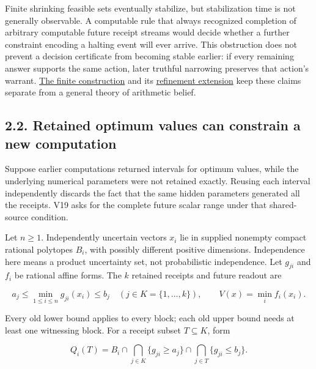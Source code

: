 \documentclass{article}
\theoremstyle{definition}
\begin{document}
Finite shrinking feasible sets eventually stabilize, but stabilization
time is not generally observable. A computable rule that always
recognized completion of arbitrary computable future receipt streams
would decide whether a further constraint encoding a halting event will
ever arrive. This obstruction does not prevent a decision certificate
from becoming stable earlier: if every remaining answer supports the
same action, later truthful narrowing preserves that action's warrant.
\href{https://github.com/TristanMiano/value_logic/blob/main/v3/derivations/03_logical_uncertainty.md}{The
finite construction} and its
\href{https://github.com/TristanMiano/value_logic/blob/main/v3/derivations/03_refinement_extensions.md}{refinement
extension} keep these claims separate from a general theory of
arithmetic belief.

\subsection{2.2. Retained optimum values can constrain a new
computation}\label{sec-range}

Suppose earlier computations returned intervals for optimum values,
while the underlying numerical parameters were not retained exactly.
Reusing each interval independently discards the fact that the same
hidden parameters generated all the receipts. V19 asks for the complete
future scalar range under that shared-source condition.

Let \(n\geq1\). Independently uncertain vectors \(x_i\) lie in supplied
nonempty compact rational polytopes \(B_i\), with possibly different
positive dimensions. Independence here means a product uncertainty set,
not probabilistic independence. Let \(g_{ji}\) and \(f_i\) be rational
affine forms. The \(k\) retained receipts and future readout are

\begin{equation}
a_j\leq\min_{1\leq i\leq n}g_{ji}(x_i)\leq b_j
 \quad(j\in K=\{1,\ldots,k\}),\qquad
 V(x)=\min_i f_i(x_i).
 \label{eq-source}
\end{equation}

Every old lower bound applies to every block; each old upper bound needs
at least one witnessing block. For a receipt subset \(T\subseteq K\),
form

\begin{equation}
Q_i(T)=B_i\cap\bigcap_{j\in K}\{g_{ji}\geq a_j\}
              \cap\bigcap_{j\in T}\{g_{ji}\leq b_j\}.
 \label{eq-slice}
\end{equation}
\end{document}
